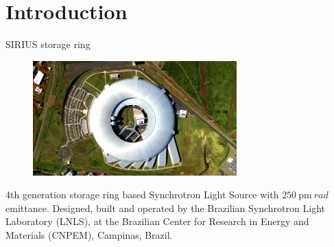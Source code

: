 \documentclass[aspectratio=169]{beamer}
\begin{document}
\section{Introduction}
\begin{frame}{SIRIUS storage ring}
    \begin{minipage}{0.35\textwidth}
        \begin{figure}
            \centering
            \includegraphics[angle=90, width=0.7\textwidth]{f1.png}
        \end{figure}
    \end{minipage}
    \hfill
    \begin{minipage}{0.62\textwidth}
        \scriptsize
        4th generation storage ring based Synchrotron Light Source with $250~\unit{\pico\meter~rad}$ emittance. Designed, built and operated by the Brazilian Synchrotron Light Laboratory (LNLS), at the Brazilian Center for Research in Energy and Materials (CNPEM), Campinas, Brazil.\\


\end{minipage}
\end{frame}
\end{document}
